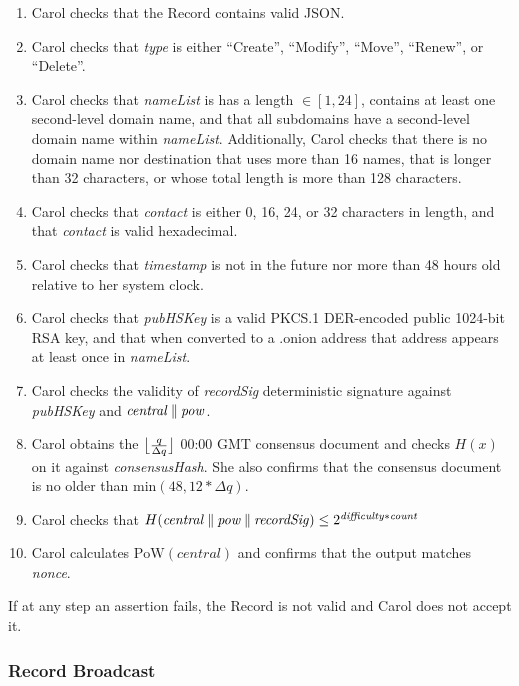 \begin{enumerate}
	\item Carol checks that the Record contains valid JSON.
	\item Carol checks that \emph{type} is either ``Create'', ``Modify'', ``Move'', ``Renew'', or ``Delete''.
	\item Carol checks that \emph{nameList} is has a length $ \in [1,24] $, contains at least one second-level domain name, and that all subdomains have a second-level domain name within \emph{nameList}. Additionally, Carol checks that there is no domain name nor destination that uses more than 16 names, that is longer than 32 characters, or whose total length is more than 128 characters.
	\item Carol checks that \emph{contact} is either 0, 16, 24, or 32 characters in length, and that \emph{contact} is valid hexadecimal.
	\item Carol checks that \emph{timestamp} is not in the future nor more than 48 hours old relative to her system clock.
	\item Carol checks that \emph{pubHSKey} is a valid PKCS.1 DER-encoded public 1024-bit RSA key, and that when converted to a .onion address that address appears at least once in \emph{nameList}.
	\item Carol checks the validity of \emph{recordSig} deterministic signature against \emph{pubHSKey} and $ \mathit{central} \concat \mathit{pow} $.
	\item Carol obtains the $ \floor[\big]{\frac{q}{\Delta q}} $ 00:00 GMT consensus document and checks $ H(x) $ on it against \emph{consensusHash}. She also confirms that the consensus document is no older than $ \mathrm{min}(48, 12 * \Delta q) $.
	\item Carol checks that $ H(\mathit{central} \concat \mathit{pow} \concat \mathit{recordSig}) \leq 2^{\mathit{difficulty} * \mathit{count}} $
	\item Carol calculates $ \mathrm{PoW}(\mathit{central}) $ and confirms that the output matches \emph{nonce}.
\end{enumerate}
	
If at any step an assertion fails, the Record is not valid and Carol does not accept it.
		
\subsubsection{Record Broadcast}


